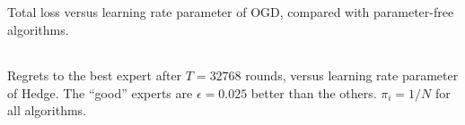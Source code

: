 \documentclass[30pt,landscape]{sciposter}
\begin{document}
\begin{multicols}{3}
{\footnotesize{Total loss versus learning rate parameter of OGD, compared with parameter-free algorithms.}

\vspace{0.2cm}

\begin{tabular}{ccc}
\end{tabular}

\footnotesize{Regrets to the best expert after $T = 32768$ rounds,
versus learning rate parameter of Hedge. The ``good'' experts
are $\epsilon=0.025$ better than the others. $\pi_i=1/N$ for all
algorithms.}
}
\end{multicols}
\end{document}
